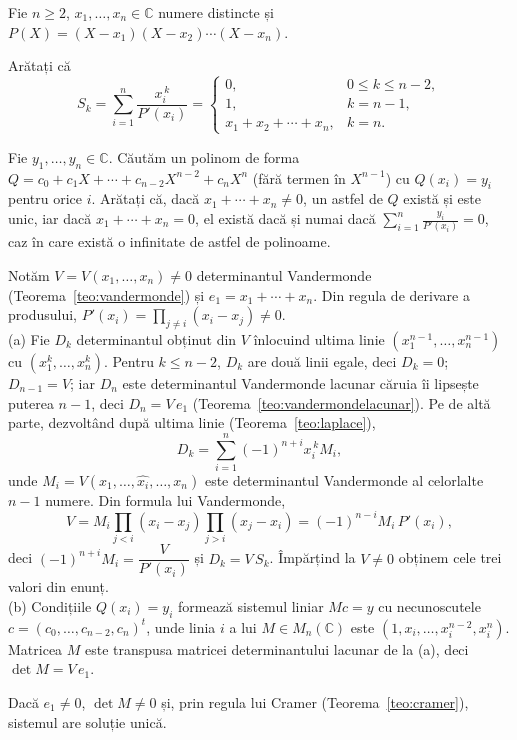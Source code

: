 Fie $n\ge2$, $x_1,\dots,x_n\in\mathbb{C}$ numere distincte și $P(X)=(X-x_1)(X-x_2)\cdots(X-x_n)$.
\begin{parti}
  \item Arătați că
  \[ S_k=\sum_{i=1}^n\frac{x_i^{\,k}}{P'(x_i)}=\begin{cases}0,&0\le k\le n-2,\\ 1,&k=n-1,\\ x_1+x_2+\cdots+x_n,&k=n.\end{cases} \]
  \item Fie $y_1,\dots,y_n\in\mathbb{C}$. Căutăm un polinom de forma $Q=c_0+c_1X+\cdots+c_{n-2}X^{n-2}+c_nX^n$ (fără termen în $X^{n-1}$) cu $Q(x_i)=y_i$ pentru orice $i$. Arătați că, dacă $x_1+\cdots+x_n\neq0$, un astfel de $Q$ există și este unic, iar dacă $x_1+\cdots+x_n=0$, el există dacă și numai dacă $\displaystyle\sum_{i=1}^n\frac{y_i}{P'(x_i)}=0$, caz în care există o infinitate de astfel de polinoame.
\end{parti}
\sol Notăm $V=V(x_1,\dots,x_n)\neq0$ determinantul Vandermonde (Teorema~\ref{teo:vandermonde}) și $e_1=x_1+\cdots+x_n$. Din regula de derivare a produsului, $P'(x_i)=\prod_{j\neq i}(x_i-x_j)\neq0$.\\[2pt]
(a) Fie $D_k$ determinantul obținut din $V$ înlocuind ultima linie $(x_1^{n-1},\dots,x_n^{n-1})$ cu $(x_1^k,\dots,x_n^k)$. Pentru $k\le n-2$, $D_k$ are două linii egale, deci $D_k=0$; $D_{n-1}=V$; iar $D_n$ este determinantul Vandermonde lacunar căruia îi lipsește puterea $n-1$, deci $D_n=V\,e_1$ (Teorema~\ref{teo:vandermondelacunar}). Pe de altă parte, dezvoltând după ultima linie (Teorema~\ref{teo:laplace}),
\[ D_k=\sum_{i=1}^n(-1)^{n+i}x_i^{\,k}M_i, \]
unde $M_i=V(x_1,\dots,\widehat{x_i},\dots,x_n)$ este determinantul Vandermonde al celorlalte $n-1$ numere. Din formula lui Vandermonde,
\[ V=M_i\prod_{j<i}(x_i-x_j)\prod_{j>i}(x_j-x_i)=(-1)^{n-i}M_i\,P'(x_i), \]
deci $(-1)^{n+i}M_i=\dfrac{V}{P'(x_i)}$ și $D_k=V\,S_k$. Împărțind la $V\neq0$ obținem cele trei valori din enunț.\\[2pt]
(b) Condițiile $Q(x_i)=y_i$ formează sistemul liniar $Mc=y$ cu necunoscutele $c=(c_0,\dots,c_{n-2},c_n)^t$, unde linia $i$ a lui $M\in M_n(\mathbb{C})$ este $(1,x_i,\dots,x_i^{n-2},x_i^n)$. Matricea $M$ este transpusa matricei determinantului lacunar de la (a), deci $\det M=V\,e_1$.

Dacă $e_1\neq0$, $\det M\neq0$ și, prin regula lui Cramer (Teorema~\ref{teo:cramer}), sistemul are soluție unică.


